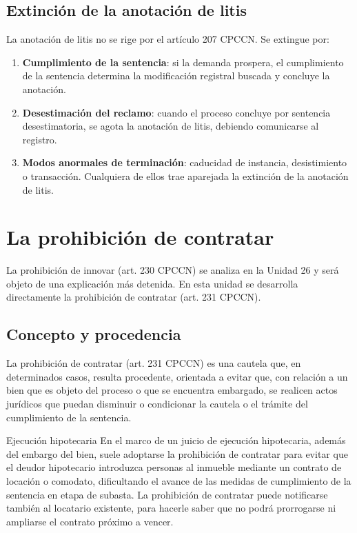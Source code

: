 \documentclass[12pt,oneside]{book}
\begin{document}
\section{Extinción de la anotación de litis}

La anotación de litis no se rige por el artículo 207 CPCCN. Se extingue por:

\begin{enumerate}
    \item \textbf{Cumplimiento de la sentencia}: si la demanda prospera, el cumplimiento de la sentencia determina la modificación registral buscada y concluye la anotación.
    \item \textbf{Desestimación del reclamo}: cuando el proceso concluye por sentencia desestimatoria, se agota la anotación de litis, debiendo comunicarse al registro.
    \item \textbf{Modos anormales de terminación}: caducidad de instancia, desistimiento o transacción. Cualquiera de ellos trae aparejada la extinción de la anotación de litis.
\end{enumerate}

\chapter{La prohibición de contratar}

\begin{note}
La prohibición de innovar (art. 230 CPCCN) se analiza en la Unidad 26 y será objeto de una explicación más detenida. En esta unidad se desarrolla directamente la prohibición de contratar (art. 231 CPCCN).
\end{note}

\section{Concepto y procedencia}

La prohibición de contratar (art. 231 CPCCN) es una cautela que, en determinados casos, resulta procedente, orientada a evitar que, con relación a un bien que es objeto del proceso o que se encuentra embargado, se realicen actos jurídicos que puedan disminuir o condicionar la cautela o el trámite del cumplimiento de la sentencia.

\begin{example}{Ejecución hipotecaria}
En el marco de un juicio de ejecución hipotecaria, además del embargo del bien, suele adoptarse la prohibición de contratar para evitar que el deudor hipotecario introduzca personas al inmueble mediante un contrato de locación o comodato, dificultando el avance de las medidas de cumplimiento de la sentencia en etapa de subasta. La prohibición de contratar puede notificarse también al locatario existente, para hacerle saber que no podrá prorrogarse ni ampliarse el contrato próximo a vencer.
\end{example}
\end{document}

